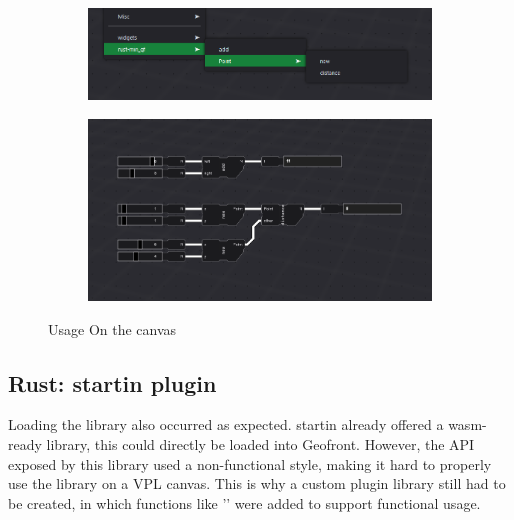 \begin{figure}
  \centering
  \begin{subfigure}[b]{0.45\linewidth}
    \graphicspath{{../../assets/images/6.1.1/}}
    \centering
    \includegraphics[width=\linewidth]{7.PNG}
    \caption{}\label{fig:rust-plugin-on-canvas:1}
  \end{subfigure}%
  \qquad %
  \begin{subfigure}[b]{0.45\linewidth}
    \graphicspath{{../../assets/images/6.1.1/}}
    \centering
    \includegraphics[width=\linewidth]{6.PNG}
    \caption{}\label{fig:rust-plugin-on-canvas:2}
  \end{subfigure}%
  \caption[minimal rust geofront plugin: usage]{Usage On the canvas}
  \label{fig:rust-plugin-on-canvas}
\end{figure}

\subsection{Rust: startin plugin}

Loading the  library also occurred as expected.
startin already offered a wasm-ready library, this could directly be loaded into Geofront. 
However, the API exposed by this library used a non-functional style, making it hard to properly use the library on a VPL canvas. 
This is why a custom plugin library still had to be created, in which functions like '' were added to support functional usage. 

